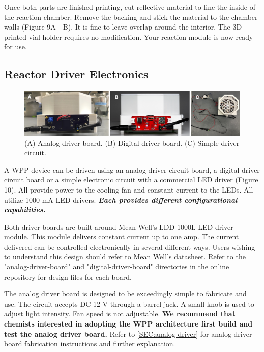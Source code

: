 \documentclass[11pt]{article}
\begin{document}
Once both parts are finished printing, cut reflective material to line the inside of the reaction chamber.
Remove the backing and stick the material to the chamber walls (Figure 9A---B).
It is fine to leave overlap around the interior.
The 3D printed vial holder requires no modification.
Your reaction module is now ready for use.

\clearpage

\subsection{Reactor Driver Electronics} \label{SEC:electronics}

\begin{figure}[H]
	\centering
	\includegraphics[width=\textwidth]{"./fig10.png"}
	\caption{(A) Analog driver board. (B) Digital driver board. (C) Simple driver circuit.}
\end{figure}

A WPP device can be driven using an analog driver circuit board, a digital driver circuit board or a simple electronic circuit with a commercial LED driver (Figure 10).
All provide power to the cooling fan and constant current to the LEDs.
All utilize 1000 mA LED drivers. 
\textbf{\textit{Each provides different configurational capabilities.}}

Both driver boards are built around Mean Well's LDD-1000L LED driver module.
This module delivers constant current up to one amp.
The current delivered can be controlled electronically in several different ways.
Users wishing to understand this design should refer to Mean Well's datasheet.
Refer to the "analog-driver-board" and "digital-driver-board" directories in the online repository for design files for each board.

The analog driver board is designed to be exceedingly simple to fabricate and use.
The circuit accepts DC 12 V through a barrel jack.
A small knob is used to adjust light intensity.
Fan speed is not adjustable.
\textbf{We recommend that chemists interested in adopting the WPP architecture first build and test the analog driver board.}
Refer to \autoref{SEC:analog-driver} for analog driver board fabrication instructions and further explanation.
\end{document}
